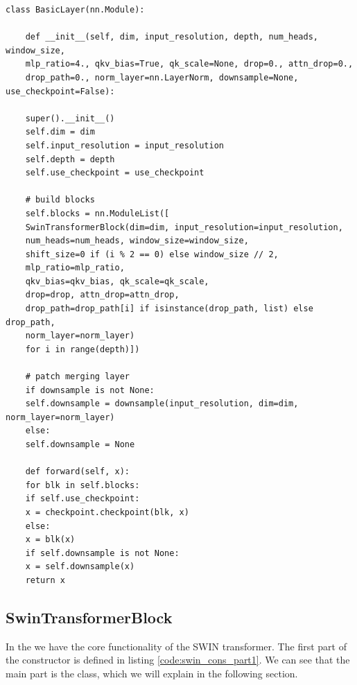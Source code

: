 \begin{lstlisting}[caption={BasicLayer module that encapsulates the SWIN block functionality. It is the definition of a stage of the SWIN transformer, as defined in \ref{fig:swinarchitecture}}, label={code:swin_basic_layer}]
	class BasicLayer(nn.Module):
	
	def __init__(self, dim, input_resolution, depth, num_heads, window_size,
	mlp_ratio=4., qkv_bias=True, qk_scale=None, drop=0., attn_drop=0.,
	drop_path=0., norm_layer=nn.LayerNorm, downsample=None, use_checkpoint=False):
	
	super().__init__()
	self.dim = dim
	self.input_resolution = input_resolution
	self.depth = depth
	self.use_checkpoint = use_checkpoint
	
	# build blocks
	self.blocks = nn.ModuleList([
	SwinTransformerBlock(dim=dim, input_resolution=input_resolution,
	num_heads=num_heads, window_size=window_size,
	shift_size=0 if (i % 2 == 0) else window_size // 2,
	mlp_ratio=mlp_ratio,
	qkv_bias=qkv_bias, qk_scale=qk_scale,
	drop=drop, attn_drop=attn_drop,
	drop_path=drop_path[i] if isinstance(drop_path, list) else drop_path,
	norm_layer=norm_layer)
	for i in range(depth)])
	
	# patch merging layer
	if downsample is not None:
	self.downsample = downsample(input_resolution, dim=dim, norm_layer=norm_layer)
	else:
	self.downsample = None
	
	def forward(self, x):
	for blk in self.blocks:
	if self.use_checkpoint:
	x = checkpoint.checkpoint(blk, x)
	else:
	x = blk(x)
	if self.downsample is not None:
	x = self.downsample(x)
	return x
\end{lstlisting}

\subsection{SwinTransformerBlock}
In the  we have the core functionality of the SWIN transformer. The first part of the constructor is defined in listing \ref{code:swin_cons_part1}. We can see that the main part is the  class, which we will explain in the following section.

